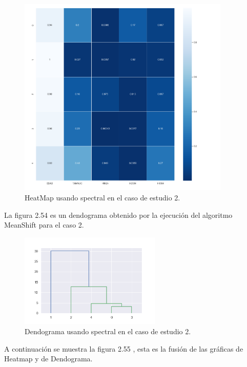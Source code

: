 	\begin{figure}[htb]
		\centering
		\includegraphics[width=0.9\textwidth]{./imagenes/caso2/heatmap_caso2_spectral}
		\caption{HeatMap usando spectral en el caso de estudio 2.} \label{fig:1}
	\end{figure}


	La figura 2.54 es un dendograma obtenido por la ejecución del algoritmo MeanShift para
	el caso 2. \\

	\begin{figure}[htb]
		\centering
		\includegraphics[width=0.6\textwidth]{./imagenes/caso2/dendograma_caso2_spectral}
		\caption{Dendograma usando spectral en el caso de estudio 2.} \label{fig:1}
	\end{figure}

	A continuación se muestra la figura 2.55 , esta es la fusión de las gráficas de 
	Heatmap y de Dendograma.  \\

